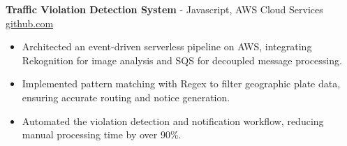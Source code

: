 \documentclass[11pt]{article}       %
\begin{document}

\textbf{Traffic Violation Detection System}{ - Javascript, AWS Cloud Services} \hfill \href{https://github.com/Monica20030707/AWS_rekonigition-N-read-database}{github.com} \\
\vspace{-9pt}
\begin{itemize}
  \item Architected an event-driven serverless pipeline on AWS, integrating Rekognition for image analysis and SQS for decoupled message processing.
  \item Implemented pattern matching with Regex to filter geographic plate data, ensuring accurate routing and notice generation.
  \item Automated the violation detection and notification workflow, reducing manual processing time by over 90\%.
\end{itemize}
\end{document}
